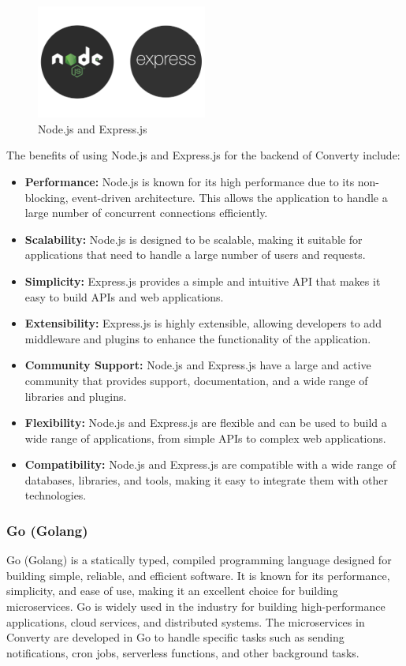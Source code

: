 \begin{figure}[H]
    \centering
    \includegraphics[width=0.5\textwidth]{Images/nodeAndExpress.png}
    \caption{Node.js and Express.js}
    \label{fig:nodeAndExpress}
\end{figure}

The benefits of using Node.js and Express.js for the backend of Converty include:

\begin{itemize}
    \item \textbf{Performance:} Node.js is known for its high performance due to its non-blocking, event-driven architecture. This allows the application to handle a large number of concurrent connections efficiently.
    \item \textbf{Scalability:} Node.js is designed to be scalable, making it suitable for applications that need to handle a large number of users and requests.
    \item \textbf{Simplicity:} Express.js provides a simple and intuitive API that makes it easy to build APIs and web applications.
    \item \textbf{Extensibility:} Express.js is highly extensible, allowing developers to add middleware and plugins to enhance the functionality of the application.
    \item \textbf{Community Support:} Node.js and Express.js have a large and active community that provides support, documentation, and a wide range of libraries and plugins.
    \item \textbf{Flexibility:} Node.js and Express.js are flexible and can be used to build a wide range of applications, from simple APIs to complex web applications.
    \item \textbf{Compatibility:} Node.js and Express.js are compatible with a wide range of databases, libraries, and tools, making it easy to integrate them with other technologies.
\end{itemize}

\subsubsection{Go (Golang)}
Go (Golang) is a statically typed, compiled programming language designed for building simple, reliable, and efficient software. It is known for its performance, simplicity, and ease of use, making it an excellent choice for building microservices. Go is widely used in the industry for building high-performance applications, cloud services, and distributed systems. The microservices in Converty are developed in Go to handle specific tasks such as sending notifications, cron jobs, serverless functions, and other background tasks.

